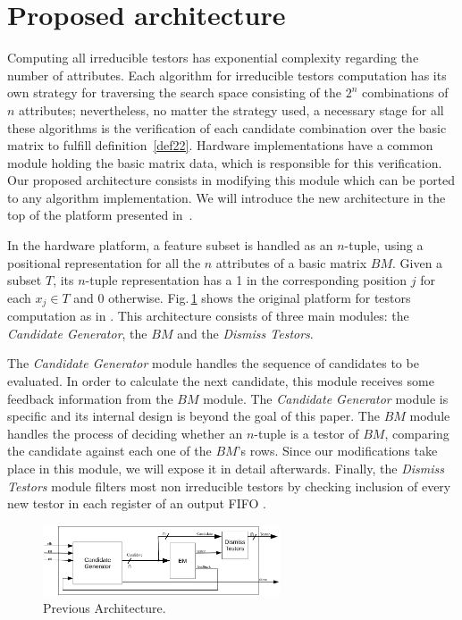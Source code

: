 \documentclass[conference]{IEEEtran}
\begin{document}
\section{Proposed architecture}
\label{sect:3}

Computing all irreducible testors has exponential complexity regarding the number of attributes. Each 
algorithm for irreducible testors computation has its own strategy for traversing the search space 
consisting of the $2^n$ combinations of $n$ attributes; nevertheless, no matter the strategy used,
a necessary stage for all these algorithms is the verification of each candidate combination 
over the basic matrix to fulfill definition~\ref{def22}. Hardware implementations have a common module 
holding the basic matrix data, which is responsible for this verification. Our proposed architecture consists in 
modifying this module which can be ported to any algorithm implementation. We will introduce the 
new architecture in the top of the platform presented in~\cite{Rojas12}.

In the hardware platform, a feature subset is handled as an $n$-tuple, using a positional 
representation for all the $n$ attributes of a basic matrix $BM$. Given a subset $T$, its $n$-tuple 
representation has a 1 in the corresponding position $j$ for each $x_j \in T$ and 0 otherwise.
Fig.\,\ref{figOldArq} shows the original platform for testors computation as in \cite{Rojas12}. This 
architecture consists of three main modules: the \textit{Candidate Generator}, the $BM$ and the 
\textit{Dismiss Testors}.

The \textit{Candidate Generator} module handles the sequence of candidates to be evaluated. In order to 
calculate the next candidate, this module receives some feedback information from the $BM$ module. The 
\textit{Candidate Generator} module is specific and its internal design is beyond the goal of this paper.
The $BM$ module handles the process of deciding whether an $n$-tuple is a testor of $BM$,
comparing the candidate against each one of the $BM$'s rows. Since our modifications take place in this 
module, we will expose it in detail afterwards. Finally, the \textit{Dismiss Testors} module filters most 
non irreducible testors by checking inclusion of every new testor in each register of an output FIFO \cite{Rojas12}.

\begin{figure}[htb]
    \centering
    \includegraphics[width=7cm]{old_arq.eps}
	\caption{Previous Architecture.}
	\label{figOldArq}
\end{figure}
\end{document}
